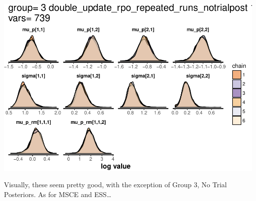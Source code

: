 \documentclass[]{article}
\begin{document}
\includegraphics{compare_vb_and_MCMC_files/figure-latex/StanPlotDensity-4.pdf}

Visually, these seem pretty good, with the exception of Group 3, No
Trial Posteriors. As for MSCE and ESS\ldots{}
\end{document}
